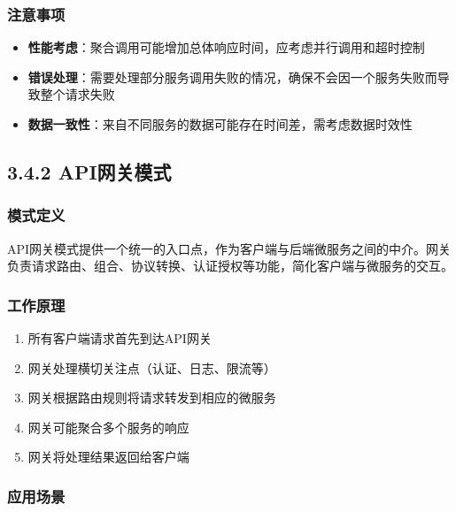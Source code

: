 \subsubsection{注意事项}\label{ux6ce8ux610fux4e8bux9879}

\begin{itemize}
\tightlist
\item
  \textbf{性能考虑}：聚合调用可能增加总体响应时间，应考虑并行调用和超时控制
\item
  \textbf{错误处理}：需要处理部分服务调用失败的情况，确保不会因一个服务失败而导致整个请求失败
\item
  \textbf{数据一致性}：来自不同服务的数据可能存在时间差，需考虑数据时效性
\end{itemize}

\subsection{3.4.2 API网关模式}\label{apiux7f51ux5173ux6a21ux5f0f}

\subsubsection{模式定义}\label{ux6a21ux5f0fux5b9aux4e49-1}

API网关模式提供一个统一的入口点，作为客户端与后端微服务之间的中介。网关负责请求路由、组合、协议转换、认证授权等功能，简化客户端与微服务的交互。

\subsubsection{工作原理}\label{ux5de5ux4f5cux539fux7406-1}

\begin{enumerate}
\def\labelenumi{\arabic{enumi}.}
\tightlist
\item
  所有客户端请求首先到达API网关
\item
  网关处理横切关注点（认证、日志、限流等）
\item
  网关根据路由规则将请求转发到相应的微服务
\item
  网关可能聚合多个服务的响应
\item
  网关将处理结果返回给客户端
\end{enumerate}

\subsubsection{应用场景}\label{ux5e94ux7528ux573aux666f-1}

